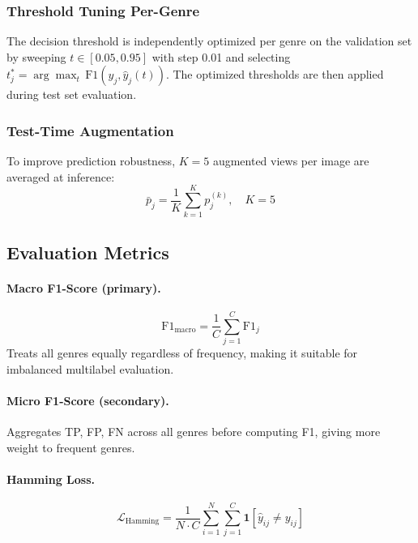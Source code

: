 \documentclass[conference]{IEEEtran}
\begin{document}
\subsubsection{Threshold Tuning Per-Genre}

The decision threshold is independently optimized per genre on the 
validation set by sweeping $t \in [0.05, 0.95]$ with step 0.01 and 
selecting $t_j^{*} = \arg\max_t\, \text{F1}(y_j, \hat{y}_j(t))$. 
The optimized thresholds are then applied during test set evaluation.

\subsubsection{Test-Time Augmentation}

To improve prediction robustness, $K{=}5$ augmented views per image 
are averaged at inference:
\begin{equation}
  \bar{p}_j = \frac{1}{K}\sum_{k=1}^{K} p_j^{(k)}, \quad K = 5
  \label{eq:tta}
\end{equation}

\subsection{Evaluation Metrics}

\paragraph{Macro F1-Score (primary).}
\begin{equation}
  \text{F1}_{\text{macro}} = \frac{1}{C}\sum_{j=1}^{C} \text{F1}_j
  \label{eq:f1macro}
\end{equation}
Treats all genres equally regardless of frequency, making it suitable 
for imbalanced multilabel evaluation.

\paragraph{Micro F1-Score (secondary).} Aggregates TP, FP, FN across 
all genres before computing F1, giving more weight to frequent genres.

\paragraph{Hamming Loss.}
\begin{equation}
  \mathcal{L}_{\text{Hamming}} = \frac{1}{N \cdot C}
  \sum_{i=1}^{N}\sum_{j=1}^{C} \mathbf{1}[\hat{y}_{ij} \neq y_{ij}]
  \label{eq:hamming}
\end{equation}
\end{document}

